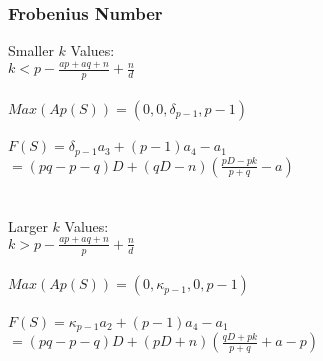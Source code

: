 \documentclass{beamer}
\begin{document}
\begin{frame}[noframenumbering]
\begin{center}
\frametitle{Frobenius Number}

Smaller $k$ Values:\\
{\footnotesize
$k < p - \frac{a p + a q + n}{p} + \frac{n}{d}$\\

~\\

$Max(Ap(S)) = \left(0, 0, \delta _ {p - 1}, p - 1\right)$\\

~\\

$F(S) = \delta _ {p - 1} a_3 + \left( p - 1 \right) a_4 - a_1$\\
$ = \left( p q - p - q \right) D + \left( q D - n \right) \left( \frac{p D - p k}{p + q} - a \right)$
}\\

~\\

~\\

Larger $k$ Values:\\
{\footnotesize
$k > p - \frac{a p + a q + n}{p} + \frac{n}{d}$\\

~\\

$Max(Ap(S)) = \left(0, \kappa _ {p - 1}, 0, p - 1\right)$\\

~\\

$F(S) = \kappa _ {p - 1} a_2 + \left( p - 1 \right) a_4 - a_1$\\
$ = \left( p q - p - q \right) D + \left( p D + n \right) \left( \frac{q D + p k}{p + q} + a - p \right)$
}

\end{center}
\end{frame}


\begin{frame}[noframenumbering]
\titlepage %
\end{frame}


\end{document}
